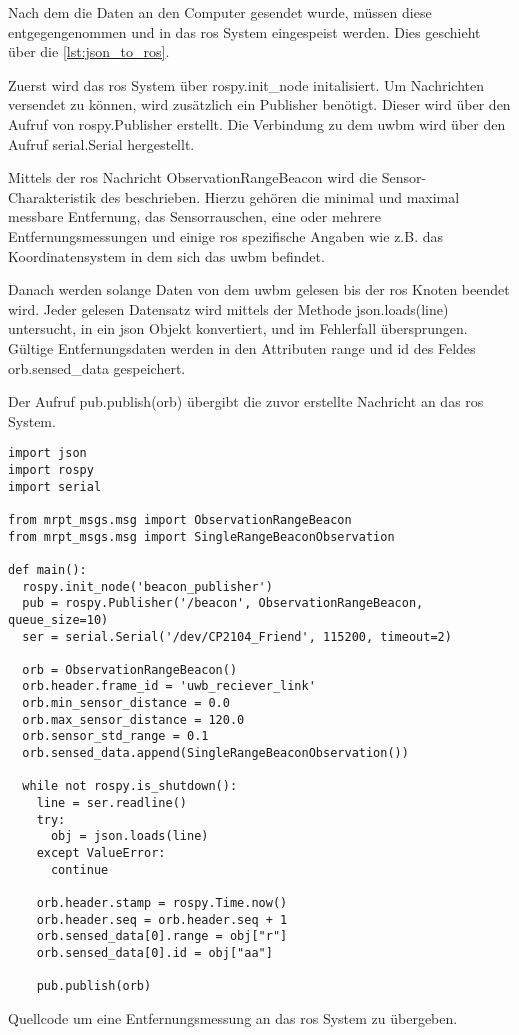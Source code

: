 Nach dem die Daten an den Computer gesendet wurde, müssen diese entgegengenommen und in das \Gls{ros} System eingespeist werden. Dies geschieht über die \autoref{lst:json_to_ros}.

Zuerst wird das \Gls{ros} System über rospy.init\_node initalisiert. Um Nachrichten versendet zu können, wird zusätzlich ein Publisher benötigt. Dieser wird über den Aufruf von rospy.Publisher erstellt. Die Verbindung zu dem \Gls{uwbm} wird über den Aufruf serial.Serial hergestellt.

Mittels der \Gls{ros} Nachricht ObservationRangeBeacon wird die Sensor-Charakteristik des  beschrieben. Hierzu gehören die minimal und maximal messbare Entfernung, das Sensorrauschen, eine oder mehrere Entfernungsmessungen und einige \Gls{ros} spezifische Angaben wie z.B. das Koordinatensystem in dem sich das \Gls{uwbm} befindet.

Danach werden solange Daten von dem \Gls{uwbm} gelesen bis der \Gls{ros} Knoten beendet wird. Jeder gelesen Datensatz wird mittels der Methode json.loads(line) untersucht, in ein \Gls{json} Objekt konvertiert, und im Fehlerfall übersprungen. Gültige Entfernungsdaten werden in den Attributen range und id des Feldes orb.sensed\_data gespeichert.

Der Aufruf pub.publish(orb) übergibt die zuvor erstellte Nachricht an das \Gls{ros} System.

\begin{listing}
	\begin{verbatim}
import json
import rospy
import serial

from mrpt_msgs.msg import ObservationRangeBeacon
from mrpt_msgs.msg import SingleRangeBeaconObservation

def main():
  rospy.init_node('beacon_publisher')
  pub = rospy.Publisher('/beacon', ObservationRangeBeacon, queue_size=10)
  ser = serial.Serial('/dev/CP2104_Friend', 115200, timeout=2)

  orb = ObservationRangeBeacon()
  orb.header.frame_id = 'uwb_reciever_link'
  orb.min_sensor_distance = 0.0
  orb.max_sensor_distance = 120.0
  orb.sensor_std_range = 0.1
  orb.sensed_data.append(SingleRangeBeaconObservation())

  while not rospy.is_shutdown():
    line = ser.readline()
    try:
      obj = json.loads(line)
    except ValueError:
      continue

    orb.header.stamp = rospy.Time.now()
    orb.header.seq = orb.header.seq + 1
    orb.sensed_data[0].range = obj["r"]
    orb.sensed_data[0].id = obj["aa"]

    pub.publish(orb)
	\end{verbatim}
	\unskip
	\caption{Quellcode um eine Entfernungsmessung an das \Gls{ros} System zu übergeben.}
	\label{lst:json_to_ros}
\end{listing}

